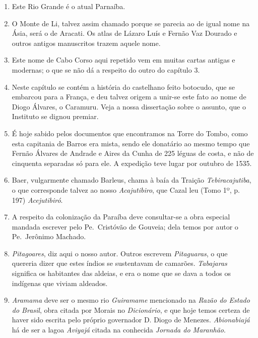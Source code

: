 \begin{enumerate}
\item Este Rio Grande é o atual Parnaíba.

\item O Monte de Li, talvez assim chamado porque se parecia ao de igual nome na Ásia, 
será o de Aracati. Os atlas de Lázaro Luís e Fernão Vaz Dourado e outros antigos 
manuscritos trazem aquele nome.

\item Este nome de Cabo Corso aqui repetido vem em muitas cartas antigas e modernas; o 
que se não dá a respeito do outro do capítulo 3.

\item Neste capítulo se contém a história do castelhano feito botocudo, que se embarcou 
para a França, e deu talvez origem a unir-se este fato ao nome de Diogo Álvares, o 
Caramuru. Veja a nossa dissertação sobre o assunto, que o Instituto se dignou premiar.

\item  É hoje sabido pelos documentos que encontramos na Torre do
Tombo, como esta capitania de Barros era mista, sendo ele donatário ao
mesmo tempo que Fernão Álvares de Andrade e Aires da Cunha de 225
léguas de costa, e não de cinquenta separadas só para ele. A expedição teve
lugar por outubro de 1535.

\item  Baer, vulgarmente chamado Barleus, chama à baía da Traição \textit{Tebiracajutiba}, 
o que corresponde talvez ao nosso \textit{Acajutibiro}, que Cazal leu
(Tomo 1º, p. 197) \textit{Acejutibiró}.

\item A respeito da colonização da Paraíba deve consultar-se a obra especial mandada 
escrever pelo Pe.~Cristóvão de Gouveia; dela temos por autor o  Pe.~Jerônimo 
Machado.

\item \textit{Pitagoares}, diz aqui o nosso autor. Outros escrevem \textit{Pitaguaras}, o que quereria 
dizer que estes índios se sustentavam de camarões. \textit{Tabajaras} significa os habitantes das 
aldeias, e era o nome que se dava a todos os indígenas que viviam aldeados.

\item \textit{Aramama} deve ser o mesmo rio \textit{Guiramame} mencionado na \textit{Razão do Estado do Brasil}, 
obra citada por Morais no \textit{Dicionário}, e que hoje temos certeza de haver sido escrita pelo 
próprio governador D. Diogo de Menezes. \textit{Abionabiajá} há de ser a lagoa \textit{Aviyajá} citada na conhecida \textit{Jornada do Maranhão}.


\end{enumerate}
